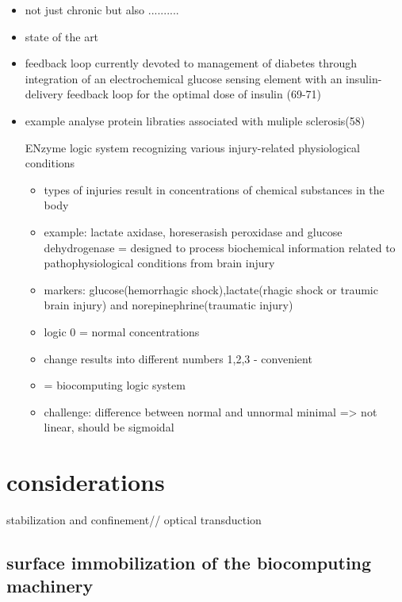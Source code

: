 \documentclass[runningheads]{llncs}
\begin{document}
	\begin{itemize}
		\item not just chronic but also ..........
		\item state of the art
		\item feedback loop currently devoted to management of diabetes through integration of an electrochemical glucose sensing element with an insulin-delivery feedback loop for the optimal dose of insulin (69-71)
		\item example analyse protein libraties associated with muliple sclerosis(58)
		
		ENzyme logic system recognizing various injury-related physiological conditions
		\begin{itemize}
			\item types of injuries result in concentrations of chemical substances in the body
			
			\item example: lactate axidase, horeserasish peroxidase and glucose dehydrogenase = designed to process biochemical information related to pathophysiological conditions from brain injury
			\item markers: glucose(hemorrhagic shock),lactate(rhagic shock or traumic brain injury) and norepinephrine(traumatic injury)
			\item logic 0 = normal concentrations
			\item change results into different numbers 1,2,3 - convenient
			\item = biocomputing logic system 
			\item challenge: difference between normal and unnormal minimal => not linear, should be sigmoidal	
		\end{itemize}
	\end{itemize}



\section{considerations}
stabilization and confinement//
optical transduction 
\subsection{surface immobilization of the biocomputing machinery}
	
	
	
\end{document}
